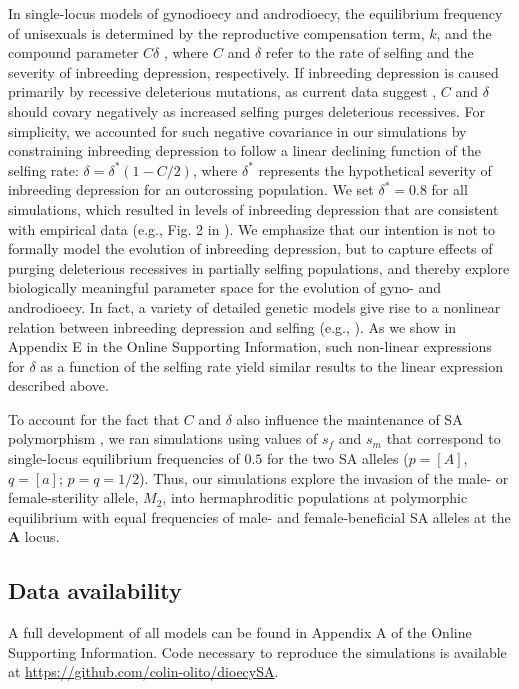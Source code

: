 \documentclass{article}
\begin{document}
In single-locus models of gynodioecy and androdioecy, the equilibrium frequency of unisexuals is determined by the reproductive compensation term, $k$, and the compound parameter $C \delta$ \citep{Charlesworth1978a}, where $C$ and $\delta$ refer to the rate of selfing and the severity of inbreeding depression, respectively. If inbreeding depression is caused primarily by recessive deleterious mutations, as current data suggest \citep{Charlesworth2009}, $C$ and $\delta$ should covary negatively as increased selfing purges deleterious recessives. For simplicity, we accounted for such negative covariance in our simulations by constraining inbreeding depression to follow a linear declining function of the selfing rate: $\delta = \delta^\ast(1 - C/2)$, where $\delta^\ast$ represents the hypothetical severity of inbreeding depression for an outcrossing population. We set $\delta^\ast = 0.8$ for all simulations, which resulted in levels of inbreeding depression that are consistent with empirical data (e.g., Fig. 2 in \citealt{HusbandSchemske1996}). We emphasize that our intention is not to formally model the evolution of inbreeding depression, but to capture effects of purging deleterious recessives in partially selfing populations, and thereby explore biologically meaningful parameter space for the evolution of gyno- and androdioecy. In fact, a variety of detailed genetic models give rise to a nonlinear relation between inbreeding depression and selfing (e.g., \citealt{OhtaCockerham1974, LandeSchemske1985, Charlesworth1985, Garcia-Dorado2017, LandePorcher2017}). As we show in Appendix E in the Online Supporting Information, such non-linear expressions for $\delta$ as a function of the selfing rate yield similar results to the linear expression described above. 

To account for the fact that $C$ and $\delta$ also influence the maintenance of SA polymorphism \citep{JordanConnallon2014,Olito2016}, we ran simulations using values of $s_f$ and $s_m$ that correspond to single-locus equilibrium frequencies of $0.5$ for the two SA alleles ($p = [A]$, $q = [a]$; $p=q=1/2$). Thus, our simulations explore the invasion of the male- or female-sterility allele, $M_2$, into hermaphroditic populations at polymorphic equilibrium with equal frequencies of male- and female-beneficial SA alleles at the $\mathbf{A}$ locus.


\subsection*{Data availability}
A full development of all models can be found in Appendix A of the Online Supporting Information. Code necessary to reproduce the simulations is available at \url{https://github.com/colin-olito/dioecySA}.
\end{document}
